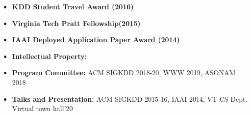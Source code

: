 
\begin{itemize}
  \setlength\itemsep{-0.2em}
\item \textbf{KDD Student Travel Award (2016)} 
\item \textbf{Virginia Tech Pratt Fellowship(2015)}
\item \textbf{IAAI Deployed Application Paper Award (2014)}
\item {\bf Intellectual Property: } 
\item {\bf Program Committee: } ACM SIGKDD 2018-20, WWW 2019, ASONAM 2018
\item {\bf Talks and Presentation: } ACM SIGKDD 2015-16, IAAI 2014, VT CS Dept. Virtual town hall'20 
\end{itemize}

